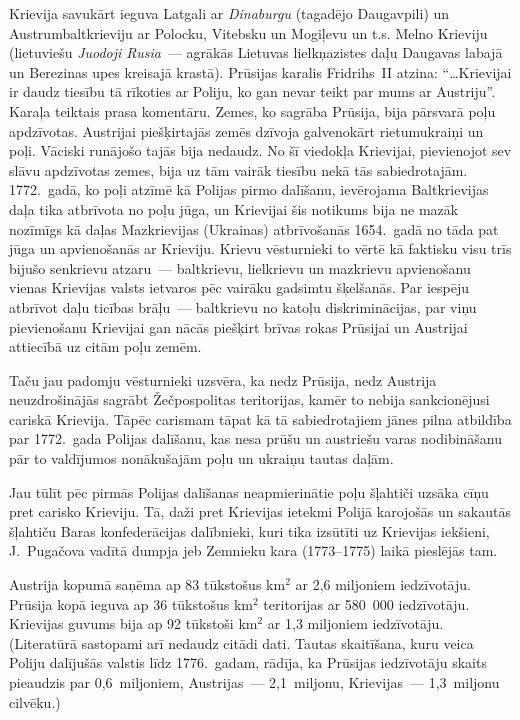 \documentclass[twoside,a5paper,12pt,fleqn,openany]{extbook}
\newcommand{\lttxti}[1]{\textit{\textlithuanian{#1}}}
\begin{document}
Krievija savukārt ieguva Latgali ar \lttxti{Dinaburgu} (tagadējo Daugavpili) un Austrumbaltkrieviju ar Polocku, Vitebsku un Mogiļevu un t.s. Melno Krieviju (lietuviešu \lttxti{Juodoji Rusia}~--- agrākās Lietuvas lielkņazistes daļu Daugavas labajā un Berezinas upes kreisajā krastā). Prūsijas karalis Fridrihs~II atzina: ``\dots{}Krievijai ir daudz tiesību tā rīkoties ar Poliju, ko gan nevar teikt par mums ar Austriju''. Karaļa teiktais prasa komentāru. Zemes, ko sagrāba Prūsija, bija pārsvarā poļu apdzīvotas. Austrijai piešķirtajās zemēs dzīvoja galvenokārt rietumukraiņi un poļi. Vāciski runājošo tajās bija nedaudz. No šī viedokļa Krievijai, pievienojot sev slāvu apdzīvotas zemes, bija uz tām vairāk tiesību nekā tās sabiedrotajām. 1772.~gadā, ko poļi atzīmē kā Polijas pirmo dalīšanu, ievērojama Baltkrievijas daļa tika atbrīvota no poļu jūga, un Krievijai šis notikums bija ne mazāk nozīmīgs kā daļas Mazkrievijas (Ukrainas) atbrīvošanās 1654.~gadā no tāda pat jūga un apvienošanās ar Krieviju. Krievu vēsturnieki to vērtē kā faktisku visu trīs bijušo senkrievu atzaru~--- baltkrievu, lielkrievu un mazkrievu apvienošanu vienas Krievijas valsts ietvaros pēc vairāku gadsimtu šķelšanās. Par iespēju atbrīvot daļu ticības brāļu~--- baltkrievu no katoļu diskriminācijas, par viņu pievienošanu Krievijai gan nācās piešķirt brīvas rokas Prūsijai un Austrijai attiecībā uz citām poļu zemēm.

Taču jau padomju vēsturnieki uzsvēra, ka nedz Prūsija, nedz Austrija neuzdrošinājās sagrābt Žečpospolitas teritorijas, kamēr to nebija sankcionējusi cariskā Krievija. Tāpēc carismam tāpat kā tā sabiedrotajiem jānes pilna atbildība par 1772.~gada Polijas dalīšanu, kas nesa prūšu un austriešu varas nodibināšanu pār to valdījumos nonākušajām poļu un ukraiņu tautas daļām.

Jau tūlīt pēc pirmās Polijas dalīšanas neapmierinātie poļu šļahtiči uzsāka cīņu pret carisko Krieviju. Tā, daži pret Krievijas ietekmi Polijā karojošās un sakautās šļahtiču Baras konfederācijas dalībnieki, kuri tika izsūtīti uz Krievijas iekšieni, J.~Pugačova vadītā dumpja jeb Zemnieku kara (1773--1775) laikā pieslējās tam.

Austrija kopumā saņēma ap 83 tūkstošus km$^{2}$ ar 2,6 miljoniem iedzīvotāju. Prūsija kopā ieguva ap 36 tūkstošus km$^{2}$ teritorijas ar 580~000 iedzīvotāju. Krievijas guvums bija ap 92 tūkstoši km$^{2}$ ar 1,3 miljoniem iedzīvotāju. (Literatūrā sastopami arī nedaudz citādi dati. Tautas skaitīšana, kuru veica Poliju dalījušās valstis līdz 1776.~gadam, rādīja, ka Prūsijas iedzīvotāju skaits pieaudzis par 0,6~miljoniem, Austrijas~--- 2,1~miljonu, Krievijas~--- 1,3~miljonu cilvēku.)
\end{document}
